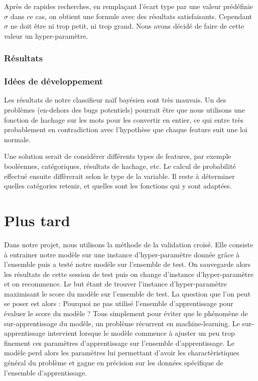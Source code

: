 \documentclass[french, 14pt]{memoir}
\begin{document}
Après de rapides recherches, en remplaçant l'écart type par une valeur prédéfinie $\sigma$ dans ce cas, on obtient une formule avec des résultats satisfaisants. Cependant $\sigma$ ne doit être ni trop petit, ni trop grand. Nous avons décidé de faire de cette valeur un hyper-paramètre.


\subsection{Résultats}


\subsection{Idées de développement}

Les résultats de notre classifieur naïf bayésien sont très mauvais. Un des problèmes (en-dehors des bugs potentiels) pourrait être que nous utilisons une fonction de hachage sur les mots pour les convertir en entier, ce qui entre très probablement en contradiction avec l'hypothèse que chaque feature suit une loi normale.

Une solution serait de considérer différents types de features, par exemple booléennes, catégoriques, résultats de hachage, etc. Le calcul de probabilité effectué ensuite diffèrerait selon le type de la variable. Il reste à déterminer quelles catégories retenir, et quelles sont les fonctions qui y sont adaptées.


\chapter*{Plus tard}

Dans notre projet, nous utilisons la méthode de la validation croisé. Elle consiste à entrainer notre modèle sur une instance d'hyper-paramètre donnée grâce à l'ensemble puis a testé notre modéle sur l'ensemble de test. On sauvegarde alors les résultats de cette session de test puis on change d'instance d'hyper-paramètre et on recommence. Le but étant de trouver l'instance d'hyper-paramètre maximisant le score du modèle sur l'ensemble de test.
La question que l'on peut se poser est alors : Pourquoi ne pas utilisé l'ensemble d'apprentissage pour évaluer le score du modèle ? 
Tous simplement pour éviter que le phénomène de sur-apprentissage du modèle, un problème récurrent en machine-learning. Le sur-apprentissage intervient lorsque le modèle commence à ajuster un peu trop finement ces paramètres d'apprentissage sur l'ensemble d'apprentissage. Le modèle perd alors les paramètres lui permettant d'avoir les charactèristiques général du problème et gagne en précision sur les données spécifique de l'ensemble d'apprentissage.
\end{document}
